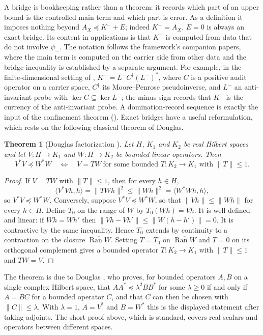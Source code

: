 \documentclass[11pt]{article}
\newcommand{\psim}{\psi_{-}}
\newcommand{\AX}{A_{X}}
\newcommand{\Kminus}{K^{-}}
\newtheorem{theorem}{Theorem}[section]
\theoremstyle{definition}
\begin{document}
A bridge is bookkeeping rather than a theorem: it records which part of
an upper bound is the controlled main term and which part is error.
As a definition it imposes nothing beyond \(\AX\preceq\Kminus+E\);
indeed \(\Kminus=\AX\), \(E=0\) is always an exact bridge.  Its content
in applications is that \(\Kminus\) is computed from data that do not
involve \(\psim\).
The notation follows the framework's companion papers, where the main
term is computed on the carrier side from other data and the bridge
inequality is established by a separate argument.  For example, in the
finite-dimensional setting of \citep{TsiokosNeedleKiller2026},
\(\Kminus=L^-C^\dagger(L^-)^*\), where \(C\) is a positive audit
operator on a carrier space, \(C^\dagger\) its Moore--Penrose
pseudoinverse, and \(L^-\) an anti-invariant probe with
\(\ker C\subseteq\ker L^-\); the minus sign records that \(\Kminus\) is
the currency of the anti-invariant probe.  A
domination-record sequence is exactly the input of the confinement
theorem ().  Exact
bridges have a useful reformulation, which rests on the following
classical theorem of Douglas.

\begin{theorem}[Douglas factorization {\citep{Douglas1966}}]
\label{thm:duality_confinement:douglas-domination}
Let \(H\), \(K_1\) and \(K_2\) be real Hilbert spaces and let
\(V:H\to K_1\) and \(W:H\to K_2\) be bounded linear operators.  Then
\[
  V^*V\preceq W^*W
  \quad\Longleftrightarrow\quad
  V=TW\ \text{for some bounded } T:K_2\to K_1 \text{ with } \|T\|\leq1.
\]
\end{theorem}

\begin{proof}
If \(V=TW\) with \(\|T\|\leq1\), then for every \(h\in H\),
\[
  \langle V^*Vh,h\rangle=\|TWh\|^2\leq\|Wh\|^2=\langle W^*Wh,h\rangle,
\]
so \(V^*V\preceq W^*W\).  Conversely, suppose \(V^*V\preceq W^*W\), so
that \(\|Vh\|\leq\|Wh\|\) for every \(h\in H\).  Define \(T_0\) on the
range of \(W\) by \(T_0(Wh)=Vh\).  It is well defined and linear: if
\(Wh=Wh'\) then \(\|Vh-Vh'\|\leq\|W(h-h')\|=0\).  It is contractive by
the same inequality.  Hence \(T_0\) extends by continuity to a
contraction on the closure \(\overline{\operatorname{Ran}W}\).  Setting
\(T=T_0\) on \(\overline{\operatorname{Ran}W}\) and \(T=0\) on its
orthogonal complement gives a bounded operator \(T:K_2\to K_1\) with
\(\|T\|\leq1\) and \(TW=V\).
\end{proof}

The theorem is due to Douglas \citep{Douglas1966}, who proves, for
bounded operators \(A,B\) on a single complex Hilbert space, that
\(AA^*\preceq\lambda^2BB^*\) for some \(\lambda\geq0\) if and only if
\(A=BC\) for a bounded operator \(C\), and that \(C\) can then be
chosen with \(\|C\|\leq\lambda\).  With \(\lambda=1\), \(A=V^*\) and
\(B=W^*\) this is the displayed statement after taking adjoints.  The
short proof above, which is standard, covers real scalars and
operators between different spaces.
\end{document}

